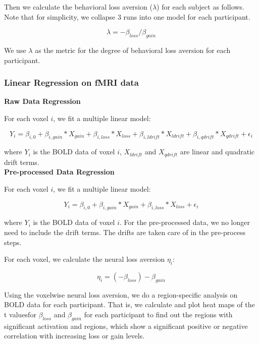 \documentclass[11pt]{article}
\begin{document}
Then we calculate the behavioral loss aversion ($ \lambda $) for each subject 
as follows. Note that for simplicity, we collapse 3 runs into one model for 
each participant.

\begin{equation}
\lambda = -\beta_{loss} / \beta_{gain}
\end{equation}

We use $\lambda$ as the metric for the degree of behavioral loss aversion for 
each participant. 

\subsubsection{Linear Regression on fMRI data}

\textbf{Raw Data Regression}

For each voxel $i$, we fit a multiple linear model:

\begin{equation}
Y_{i} = \beta_{i, 0} + \beta_{i, gain} * X_{gain}  + \beta_{i, loss} *X_{loss} 
+ \beta_{i,ldrift} *X_{ldrift} + \beta_{i, qdrift} * X_{qdrift} 
+ \epsilon_i
\end{equation}

where $Y_{i}$ is the BOLD data of voxel $i$,  $X_{ldrift}$ and $X_{qdrift}$ are 
linear and quadratic drift terms. \\

\textbf{Pre-processed Data Regression}

For each voxel $i$, we fit a multiple linear model:

\begin{equation}
Y_{i} = \beta_{i, 0} + \beta_{i, gain} * X_{gain}  +  \beta_{i, loss} *X_{loss} 
+ \epsilon_i
\end{equation}

where $Y_{i}$ is the BOLD data of voxel $i$.
For the pre-processed data, we no longer need to include the drift terms. The 
drifts are taken care of in the pre-process steps.

For each voxel, we calculate the 
neural loss aversion $\eta_i$:

\begin{equation}
\eta_i = (-\beta_{loss}) - \beta_{gain}
\end{equation}

Using the voxelwise neural loss aversion, we do a region-specific analysis on 
BOLD data for each participant. That is, we calculate and plot heat maps of the 
t valuesfor $\beta_{loss}$ and $\beta_{gain}$ for each participant to find out 
the regions with significant activation and regions, which show a significant 
positive or negative correlation with increasing loss or gain levels.
\end{document}
